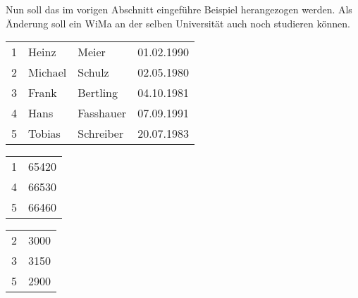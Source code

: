           Nun soll das im vorigen Abschnitt eingef\"uhre Beispiel herangezogen werden. Als \"Anderung soll ein WiMa an der selben Universit\"at auch noch studieren k\"onnen.
\vfil
          \begin{supertabular}[h]{llll}
            1 & Heinz & Meier & 01.02.1990 \\
            2 & Michael & Schulz & 02.05.1980 \\
            3 & Frank & Bertling & 04.10.1981 \\
            4 & Hans & Fasshauer & 07.09.1991 \\
            5 & Tobias & Schreiber & 20.07.1983 \\
          \end{supertabular}
\vfil
          \begin{supertabular}[h]{lp{5cm}}
            1 & 65420\\
            4 & 66530\\
            5 & 66460\\
          \end{supertabular}

          \begin{supertabular}[h]{lp{5cm}}
            2 & 3000\\
            3 & 3150\\
            5 & 2900\\
          \end{supertabular}

